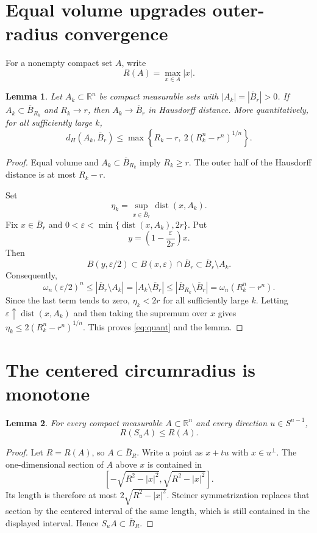 \documentclass[11pt]{article}
\newtheorem{lemma}{Lemma}
\newcommand{\R}{\mathbb R}
\newcommand{\dist}{\operatorname{dist}}
\begin{document}
\section{Equal volume upgrades outer-radius convergence}

For a nonempty compact set $A$, write
\[
 R(A)=\max_{x\in A}|x|.
\]

\begin{lemma}\label{lem:shell}
Let $A_k\subset\R^n$ be compact measurable sets with
$|A_k|=|\overline B_r|>0$. If $A_k\subset\overline B_{R_k}$ and
$R_k\to r$, then $A_k\to\overline B_r$ in Hausdorff distance.
More quantitatively, for all sufficiently large $k$,
\begin{equation}\label{eq:quant}
 d_H(A_k,\overline B_r)
 \leq \max\left\{R_k-r,\ 2(R_k^n-r^n)^{1/n}\right\}.
\end{equation}
\end{lemma}

\begin{proof}
Equal volume and $A_k\subset\overline B_{R_k}$ imply $R_k\geq r$. The outer
half of the Hausdorff distance is at most $R_k-r$.

Set
\[
 \eta_k=\sup_{x\in\overline B_r}\dist(x,A_k).
\]
Fix $x\in\overline B_r$ and $0<\varepsilon<\min\{\dist(x,A_k),2r\}$. Put
\[
 y=\left(1-\frac{\varepsilon}{2r}\right)x.
\]
Then
\[
 B(y,\varepsilon/2)\subset B(x,\varepsilon)\cap\overline B_r
 \subset \overline B_r\setminus A_k.
\]
Consequently,
\[
 \omega_n(\varepsilon/2)^n
 \leq |\overline B_r\setminus A_k|
 =|A_k\setminus\overline B_r|
 \leq |\overline B_{R_k}\setminus\overline B_r|
 =\omega_n(R_k^n-r^n).
\]
Since the last term tends to zero, $\eta_k<2r$ for all sufficiently large
$k$. Letting $\varepsilon\uparrow\dist(x,A_k)$ and then taking the supremum
over $x$ gives $\eta_k\leq2(R_k^n-r^n)^{1/n}$. This proves
\eqref{eq:quant} and the lemma.
\end{proof}

\section{The centered circumradius is monotone}

\begin{lemma}\label{lem:radius}
For every compact measurable $A\subset\R^n$ and every direction
$u\in S^{n-1}$,
\[
 R(S_uA)\leq R(A).
\]
\end{lemma}

\begin{proof}
Let $R=R(A)$, so $A\subset\overline B_R$. Write a point as $x+tu$ with
$x\in u^\perp$. The one-dimensional section of $A$ above $x$ is contained in
\[
 \left[-\sqrt{R^2-|x|^2},\sqrt{R^2-|x|^2}\right].
\]
Its length is therefore at most $2\sqrt{R^2-|x|^2}$. Steiner symmetrization
replaces that section by the centered interval of the same length, which is
still contained in the displayed interval. Hence $S_uA\subset\overline B_R$.
\end{proof}
\end{document}
